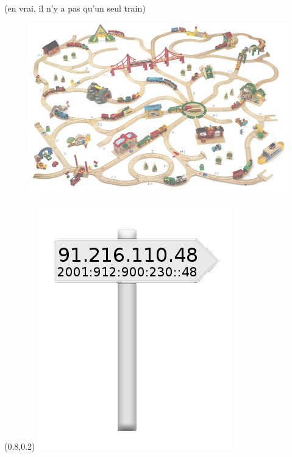 \begin{frame}{\hfill(en vrai, il n'y a pas qu'un seul train)}
  \begin{figure}
    \includegraphics[width=\textwidth]{concepts/rails.png}
  \end{figure}
  \begin{textblock*}{8em}(0.8\textwidth,0.2\textheight)
    \includegraphics[width=\textwidth]{concepts/ipdirection.png}

\end{textblock*}
\end{frame}
